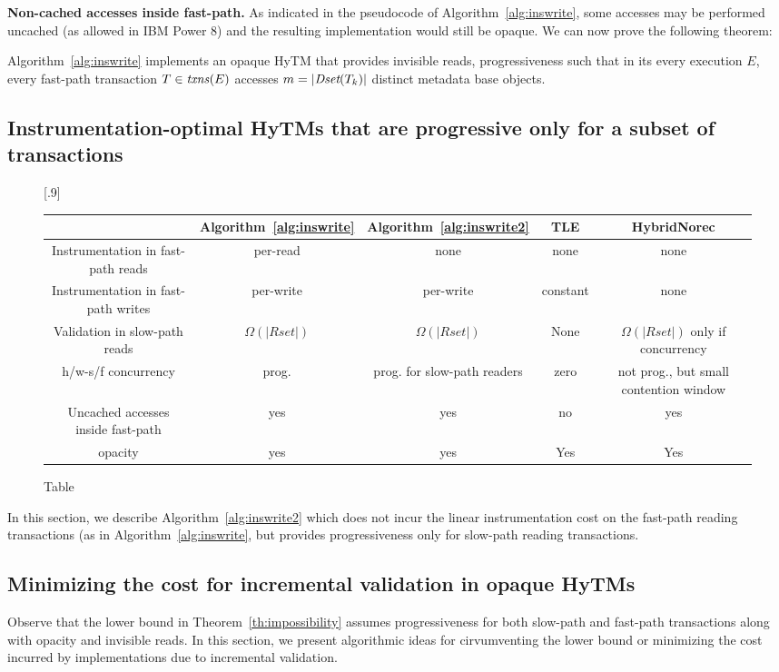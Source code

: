 \vspace{1mm}\noindent\textbf{Non-cached accesses inside fast-path.}
As indicated in the pseudocode of Algorithm~\ref{alg:inswrite}, some accesses may be performed uncached (as allowed
in IBM Power 8) and the resulting implementation would still be opaque. 
We can now prove the following theorem:
%
\begin{theorem}
\label{th:inswrite}
Algorithm~\ref{alg:inswrite} implements an opaque HyTM that provides invisible reads, progressiveness
such that in its every execution $E$, every fast-path transaction $T\in \ms{txns}(E)$
accesses $m=|\textit{Dset}(T_k)|$ distinct metadata base objects.
\end{theorem}
%
\subsection{Instrumentation-optimal HyTMs that are progressive only for a subset of transactions}
\label{sec:hytm2}
%
\begin{figure*}[!h]
      
     \scalebox{.9}[.9]{
     \begin{tabularx}{\textwidth}{c|c|c|c|c}
	~~~~~ & Algorithm~\ref{alg:inswrite} & Algorithm~\ref{alg:inswrite2} & TLE & HybridNorec\\ \hline
	Instrumentation in fast-path reads & per-read & none & none & none \\ \hline
	Instrumentation in fast-path writes & per-write & per-write & constant & none \\ \hline
	Validation in slow-path reads & $\Omega(|Rset|)$ & $\Omega(|Rset|)$ & None & $\Omega(|Rset|)$ only if concurrency \\ \hline
	h/w-s/f concurrency & prog. & prog. for slow-path readers & zero & not prog., but small contention window \\ \hline
	Uncached accesses inside fast-path & yes & yes & no & yes \\ \hline
	opacity & yes & yes & Yes & Yes 
   \end{tabularx}
\caption{Table}\label{fig:main}    
}
\end{figure*}
%
In this section, we describe Algorithm~\ref{alg:inswrite2} which does not incur the linear instrumentation cost
on the fast-path reading transactions (as in Algorithm~\ref{alg:inswrite}, but provides progressiveness only
for slow-path reading transactions.
%

%
\subsection{Minimizing the cost for incremental validation in opaque HyTMs}
\label{sec:middlepath}
%
%
Observe that the lower bound in Theorem~\ref{th:impossibility} assumes progressiveness for both slow-path and fast-path transactions
along with opacity and invisible reads.
In this section, we present algorithmic ideas for cirvumventing the lower bound or minimizing the cost incurred
by implementations due to incremental validation.

